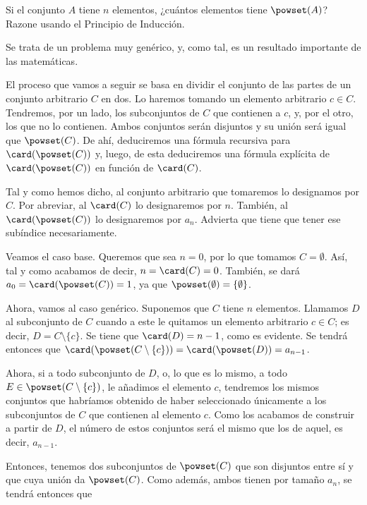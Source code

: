 \begin{example}
  Si el conjunto $A$ tiene $n$ elementos, ¿cuántos elementos tiene
  $\powset(A)$? Razone usando el Principio de Inducción.

  Se trata de un problema muy genérico, y, como tal, es un resultado
  importante de las matemáticas.


  El proceso que vamos a seguir se basa en dividir el conjunto de las partes
  de un conjunto arbitrario $C$ en dos. Lo haremos tomando un elemento
  arbitrario $c \in C$. Tendremos, por un lado, los subconjuntos de $C$ que
  contienen a $c$, y, por el otro, los que no lo contienen. Ambos conjuntos
  serán disjuntos y su unión será igual que $\powset(C)$. De ahí,
  deduciremos una fórmula recursiva para $\card(\powset(C))$ y, luego, de
  esta deduciremos una fórmula explícita de $\card(\powset(C))$ en función
  de $\card(C)$.

  Tal y como hemos dicho, al conjunto arbitrario que tomaremos lo designamos
  por $C$. Por abreviar, al $\card(C)$ lo designaremos por $n$. También, al
  $\card(\powset(C))$ lo designaremos por $a_n$. Advierta que tiene que
  tener ese subíndice necesariamente.

  Veamos el caso base. Queremos que sea $n = 0$, por lo que tomamos $C =
  \emptyset$. Así, tal y como acabamos de decir, $n = \card(C) = 0$.
  También, se dará $a_0 = \card(\powset(C)) = 1$, ya que $\powset(\emptyset)
  = \{\emptyset\}$.

  Ahora, vamos al caso genérico. Suponemos que $C$ tiene $n$ elementos.
  Llamamos $D$ al subconjunto de $C$ cuando a este le quitamos un elemento
  arbitrario $c \in C$; es decir, $D = C \setminus \{c\}$. Se tiene que
  $\card(D) = n - 1$, como es evidente. Se tendrá entonces que
  $\card(\powset(C \setminus \{c\})) = \card(\powset(D)) = a_{n-1}$.


  Ahora, si a todo subconjunto de $D$, o, lo que es lo mismo, a todo $E \in
  \powset(C \setminus \{c\})$, le añadimos el elemento $c$, tendremos los
  mismos conjuntos que habríamos obtenido de haber seleccionado únicamente a
  los subconjuntos de $C$ que contienen al elemento $c$. Como los acabamos
  de construir a partir de $D$, el número de estos conjuntos será el mismo
  que los de aquel, es decir, $a_{n-1}$.

  Entonces, tenemos dos subconjuntos de $\powset(C)$ que son disjuntos entre
  sí y que cuya unión da $\powset(C)$. Como además, ambos tienen por tamaño
  $a_n$, se tendrá entonces que


\end{example}
